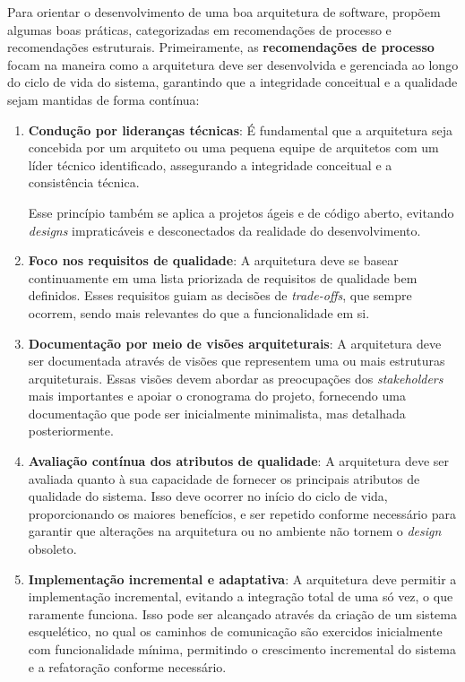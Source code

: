 Para orientar o desenvolvimento de uma boa arquitetura de software,  propõem algumas boas práticas, categorizadas em recomendações de processo e recomendações estruturais. Primeiramente, as \textbf{recomendações de processo} focam na maneira como a arquitetura deve ser desenvolvida e gerenciada ao longo do ciclo de vida do sistema, garantindo que a integridade conceitual e a qualidade sejam mantidas de forma contínua:

\begin{enumerate}
    \item \textbf{Condução por lideranças técnicas}: É fundamental que a arquitetura seja concebida por um arquiteto ou uma pequena equipe de arquitetos com um líder técnico identificado, assegurando a integridade conceitual e a consistência técnica. 
    
    Esse princípio também se aplica a projetos ágeis e de código aberto, evitando \textit{designs} impraticáveis e desconectados da realidade do desenvolvimento.
    
    \item \textbf{Foco nos requisitos de qualidade}: A arquitetura deve se basear continuamente em uma lista priorizada de requisitos de qualidade bem definidos. Esses requisitos guiam as decisões de \textit{trade-offs}, que sempre ocorrem, sendo mais relevantes do que a funcionalidade em si.
    
    \item \textbf{Documentação por meio de visões arquiteturais}: A arquitetura deve ser documentada através de visões que representem uma ou mais estruturas arquiteturais. Essas visões devem abordar as preocupações dos \textit{stakeholders} mais importantes e apoiar o cronograma do projeto, fornecendo uma documentação que pode ser inicialmente minimalista, mas detalhada posteriormente.
    
    \item \textbf{Avaliação contínua dos atributos de qualidade}: A arquitetura deve ser avaliada quanto à sua capacidade de fornecer os principais atributos de qualidade do sistema. Isso deve ocorrer no início do ciclo de vida, proporcionando os maiores benefícios, e ser repetido conforme necessário para garantir que alterações na arquitetura ou no ambiente não tornem o \textit{design} obsoleto.
    
    \item \textbf{Implementação incremental e adaptativa}: A arquitetura deve permitir a implementação incremental, evitando a integração total de uma só vez, o que raramente funciona. Isso pode ser alcançado através da criação de um sistema esquelético, no qual os caminhos de comunicação são exercidos inicialmente com funcionalidade mínima, permitindo o crescimento incremental do sistema e a refatoração conforme necessário.
\end{enumerate}

